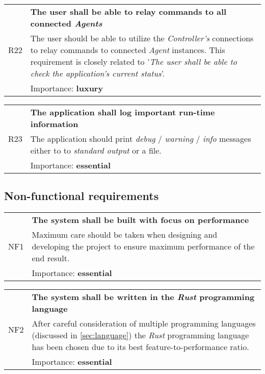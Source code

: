             \vspace{0.5cm}
            \noindent
            \begin{tabular}{ p{0.7cm}|p{14.5cm} }
                \multirow{3}{*}{R22} & \textbf{The user shall be able to relay commands to all connected \textit{Agents}}\\
                \cline{2-2}
                & The user should be able to utilize the \textit{Controller's} connections to relay commands to connected \textit{Agent} instances. This requirement is closely related to '\textit{The user shall be able to check the application's current status}'.\\
                \cline{2-2}
                & Importance: \textbf{luxury}
            \end{tabular}

            \vspace{0.5cm}
            \noindent
            \begin{tabular}{ p{0.7cm}|p{14.5cm} }
                \multirow{3}{*}{R23} & \textbf{The application shall log important run-time information}\\
                \cline{2-2}
                & The application should print \textit{debug} / \textit{warning} / \textit{info} messages either to to \textit{standard output} or a file.\\
                \cline{2-2}
                & Importance: \textbf{essential}
            \end{tabular}



    \subsection{Non-functional requirements}
        \begin{tabular}{ p{0.7cm}|p{14.5cm} }
            \multirow{3}{*}{NF1} & \textbf{The system shall be built with focus on performance}\\
            \cline{2-2}
            & Maximum care should be taken when designing and developing the project to ensure maximum performance of the end result.\\
            \cline{2-2}
            & Importance: \textbf{essential}
        \end{tabular}

        \vspace{0.5cm}
        \noindent
        \begin{tabular}{ p{0.7cm}|p{14.5cm} }
            \multirow{3}{*}{NF2} & \textbf{The system shall be written in the \textit{Rust} programming language}\\
            \cline{2-2}
            & After careful consideration of multiple programming languages (discussed in \autoref{sec:language}) the \textit{Rust} programming language has been chosen due to its best feature-to-performance ratio.\\
            \cline{2-2}
            & Importance: \textbf{essential}
        \end{tabular}

